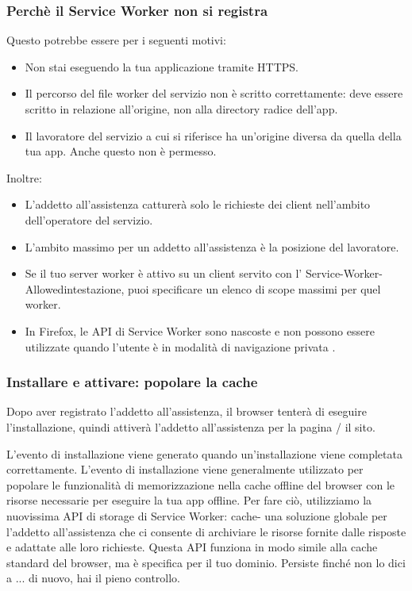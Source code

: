\documentclass[italian]{article}
\begin{document}
\subsubsection{Perchè il Service Worker non si registra}
Questo potrebbe essere per i seguenti motivi:
\begin{itemize}
\item Non stai eseguendo la tua applicazione tramite HTTPS.
\item Il percorso del file worker del servizio non è scritto correttamente: deve essere scritto in relazione all'origine, non alla directory radice dell'app.
\item Il lavoratore del servizio a cui si riferisce ha un'origine diversa da quella della tua app. Anche questo non è permesso.
\end{itemize}
Inoltre:
\begin{itemize}
	\item L'addetto all'assistenza catturerà solo le richieste dei client nell'ambito dell'operatore del servizio.
	\item L'ambito massimo per un addetto all'assistenza è la posizione del lavoratore.
	\item Se il tuo server worker è attivo su un client servito con l' Service-Worker-Allowedintestazione, puoi specificare un elenco di scope massimi per quel worker.
	\item In Firefox, le API di Service Worker sono nascoste e non possono essere utilizzate quando l'utente è in modalità di navigazione privata .
\end{itemize}

\subsubsection{Installare e attivare: popolare la cache}
Dopo aver registrato l'addetto all'assistenza, il browser tenterà di eseguire l'installazione, quindi attiverà l'addetto all'assistenza per la pagina / il sito. 

L'evento di installazione viene generato quando un'installazione viene completata correttamente. L'evento di installazione viene generalmente utilizzato per popolare le funzionalità di memorizzazione nella cache offline del browser con le risorse necessarie per eseguire la tua app offline. Per fare ciò, utilizziamo la nuovissima API di storage di Service Worker: cache- una soluzione globale per l'addetto all'assistenza che ci consente di archiviare le risorse fornite dalle risposte e adattate alle loro richieste. Questa API funziona in modo simile alla cache standard del browser, ma è specifica per il tuo dominio. Persiste finché non lo dici a ... di nuovo, hai il pieno controllo.
\end{document}
